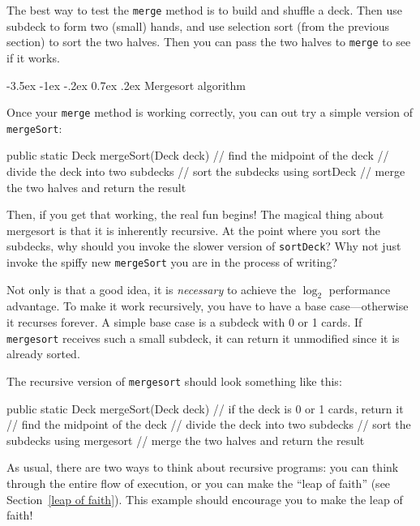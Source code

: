 \documentclass[12pt]{book}
\makeatletter
\theoremstyle{exercise}
\newcommand{\java}[1]{\verb"#1"}
\renewcommand{\section}{\@startsection {section}{1}{\z@}%
    {-3.5ex \@plus -1ex \@minus -.2ex}%
    {0.7ex \@plus.2ex}%
    {\normalfont\Large\bfseries}}
\newcommand{\java}[1]{\lstinline{#1}} %
\makeatother
\begin{document}

The best way to test the \java{merge} method is to build and shuffle a deck.
Then use subdeck to form two (small) hands, and use selection sort (from the previous section) to sort the two halves.
Then you can pass the two halves to \java{merge} to see if it works.

\section{Mergesort algorithm}

Once your \java{merge} method is working correctly, you can out try a simple version of \java{mergeSort}:

\begin{code}
public static Deck mergeSort(Deck deck) {
    // find the midpoint of the deck
    // divide the deck into two subdecks
    // sort the subdecks using sortDeck
    // merge the two halves and return the result
}
\end{code}

Then, if you get that working, the real fun begins!
The magical thing about mergesort is that it is inherently recursive.
At the point where you sort the subdecks, why should you invoke the slower version of \java{sortDeck}?
Why not just invoke the spiffy new \java{mergeSort} you are in the process of writing?


Not only is that a good idea, it is {\em necessary} to achieve the $\log_2$ performance advantage.
To make it work recursively, you have to have a base case---otherwise it recurses forever.
A simple base case is a subdeck with 0 or 1 cards.
If \java{mergesort} receives such a small subdeck, it can return it unmodified since it is already sorted.

The recursive version of \java{mergesort} should look something like this:

\begin{code}
public static Deck mergeSort(Deck deck) {
    // if the deck is 0 or 1 cards, return it
    // find the midpoint of the deck
    // divide the deck into two subdecks
    // sort the subdecks using mergesort
    // merge the two halves and return the result
}
\end{code}


As usual, there are two ways to think about recursive programs: you can think through the entire flow of execution, or you can make the ``leap of faith'' (see Section~\ref{leap of faith}).
This example should encourage you to make the leap of faith!
\end{document}
